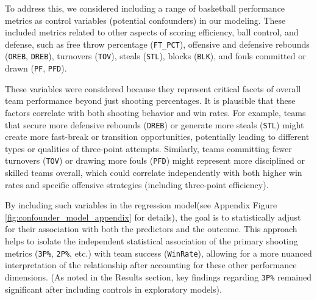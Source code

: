 \documentclass[11pt, a4paper]{article} %
\begin{document}
To address this, we considered including a range of basketball performance metrics as control variables (potential confounders) 
in our modeling. These included metrics related to other aspects of scoring efficiency, ball control, and defense, such as free 
throw percentage (\texttt{FT\_PCT}), offensive and defensive rebounds (\texttt{OREB}, \texttt{DREB}), turnovers (\texttt{TOV}), 
steals (\texttt{STL}), blocks (\texttt{BLK}), and fouls committed or drawn (\texttt{PF}, \texttt{PFD}).

These variables were considered because they represent critical facets of overall team performance beyond just shooting percentages. 
It is plausible that these factors correlate with both shooting behavior and win rates. For example, teams that secure more 
defensive rebounds (\texttt{DREB}) or generate more steals (\texttt{STL}) might create more fast-break or transition opportunities, 
potentially leading to different types or qualities of three-point attempts. Similarly, teams committing fewer 
turnovers (\texttt{TOV}) or drawing more fouls (\texttt{PFD}) might represent more disciplined or skilled teams overall, 
which could correlate independently with both higher win rates and specific offensive strategies (including three-point efficiency).

By including such variables in the regression model(see Appendix Figure \ref{fig:confounder_model_appendix} for details), the goal is to statistically adjust for their association with both the 
predictors and the outcome. This approach helps to isolate the independent statistical association of the primary shooting 
metrics (\texttt{3P\%}, \texttt{2P\%}, etc.) with team success (\texttt{WinRate}), allowing for a more nuanced interpretation 
of the relationship after accounting for these other performance dimensions. (As noted in the Results section, key findings 
regarding \texttt{3P\%} remained significant after including controls in exploratory models).
\end{document}
